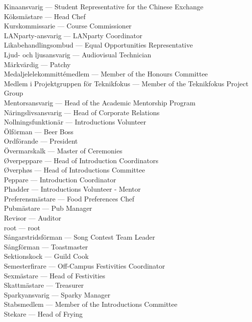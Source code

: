 \documentclass{dsekkallelse}
\begin{document}
Kinaansvarig ---	Student Representative for the Chinese Exchange\\
Köksmästare ---	Head Chef\\
Kurskommissarie ---	Course Commissioner\\
LANparty-ansvarig ---	LANparty Coordinator\\
Likabehandlingsombud ---	Equal Opportunities Representative\\
Ljud- och ljusansvarig ---	Audiovisual Technician\\
Märkvärdig ---	Patchy\\
Medaljelelekommittémedlem ---	Member of the Honours Committee\\
Medlem i Projektgruppen för Teknikfokus ---	Member of the Teknikfokus Project Group\\
Mentorsansvarig ---	Head of the Academic Mentorship Program\\
Näringslivsansvarig ---	Head of Corporate Relations\\
Nollningsfunktionär ---	Introductions Volunteer\\
Ölförman ---	Beer Boss\\
Ordförande ---	President\\
Övermarskalk ---	Master of Ceremonies\\
Øverpeppare ---	Head of Introduction Coordinators\\
Øverphøs ---	Head of Introductions Committee\\
Peppare ---	Introduction Coordinator\\
Phadder ---	Introductions Volunteer - Mentor\\
Preferensmästare ---	Food Preferences Chef\\
Pubmästare ---	Pub Manager\\
Revisor	 --- Auditor\\
root ---	root\\
Sångarstridsförman ---	Song Contest Team Leader\\
Sångförman ---	Toastmaster\\
Sektionskock ---	Guild Cook\\
Semesterfirare ---	Off-Campus Festivities Coordinator\\
Sexmästare ---	Head of Festivities\\
Skattmästare ---	Treasurer\\
Sparkyansvarig ---	Sparky Manager\\
Stabsmedlem ---	Member of the Introductions Committee\\
Stekare ---	Head of Frying\\
\end{document}
